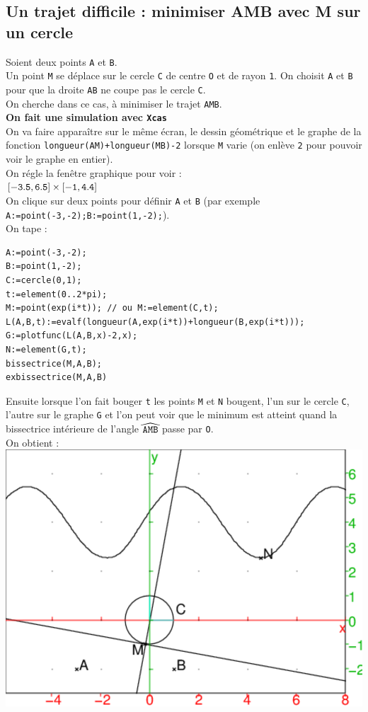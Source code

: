 \documentclass[a4paper,11pt]{book}
\begin{document}
\subsection{Un trajet difficile : minimiser AMB  avec M sur un cercle}
Soient deux points {\tt A} et {\tt B}.\\
Un point {\tt M} se d\'eplace sur le cercle  {\tt C} de centre {\tt O} et de 
rayon {\tt 1}. On choisit {\tt A} et {\tt B} pour que la droite {\tt AB}
ne coupe pas le cercle {\tt C}.\\
On cherche dans ce cas, \`a minimiser le trajet {\tt AMB}.\\ 
{\bf On fait une simulation avec {\tt Xcas}}\\
 On va faire appara\^{i}tre sur le m\^eme \'ecran, le dessin 
g\'eom\'etrique et le graphe de la fonction {\tt longueur(AM)+longueur(MB)-2}
lorsque {\tt M} varie (on enl\`eve {\tt 2} pour pouvoir voir 
le graphe en entier).\\
On r\'egle la fen\^etre graphique pour voir :\\
${\tt [-3.5,6.5] \times [-1,4.4] }$\\
On clique sur deux points pour d\'efinir {\tt A} et {\tt B} (par exemple
{\tt A:=point(-3,-2);B:=point(1,-2);}).\\
On tape :\\
\begin{verbatim}
A:=point(-3,-2);
B:=point(1,-2);
C:=cercle(0,1);
t:=element(0..2*pi);
M:=point(exp(i*t)); // ou M:=element(C,t);
L(A,B,t):=evalf(longueur(A,exp(i*t))+longueur(B,exp(i*t)));
G:=plotfunc(L(A,B,x)-2,x);
N:=element(G,t);
bissectrice(M,A,B);
exbissectrice(M,A,B)
\end{verbatim}
Ensuite lorsque l'on fait bouger {\tt t} les points {\tt M} et {\tt N} bougent,
l'un sur le cercle {\tt C}, l'autre sur le graphe {\tt G} et l'on peut voir que
le minimum est atteint quand la bissectrice int\'erieure de l'angle 
${\tt \widehat{AMB}}$ passe par {\tt O}.\\
On obtient :\\
\includegraphics[width=\textwidth]{minamb}\\
\end{document}
